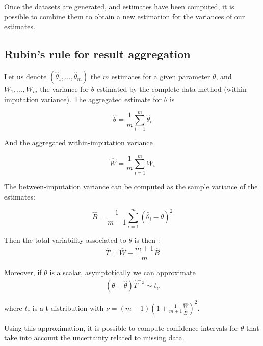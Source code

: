 Once the datasets are generated, and estimates have been computed, it is possible to combine them to obtain a new estimation for the variances of our estimates\cite[Ch.\ 5]{Rubin_missdata}.

		\subsection{Rubin's rule for result aggregation}

Let us denote $(\hat{\theta}_1, \ldots, \hat{\theta}_m)$ the $m$ estimates for a given parameter $\theta$, and $W_1, \ldots, W_m$ the variance for $\theta$ estimated by the complete-data method (within-imputation variance). The aggregated estimate for $\theta$ is

$$\hat{\theta} = \frac{1}{m} \sum\limits_{i=1}^m \hat{\theta}_i $$

And the aggregated within-imputation variance 

$$ \hat{W} = \frac{1}{m} \sum\limits_{i=1}^m W_i  $$

The between-imputation variance can be computed as the sample variance of the estimates:

$$\hat{B} = \frac{1}{m-1} \sum\limits_{i=1}^m (\hat{\theta}_i - \hat{\theta})^2$$

Then the total variability associated to $\theta$ is then \cite[Ch.\ 5]{Rubin_missdata}:
$$\hat{T} = \hat{W} + \frac{m+1}{m} \hat{B}$$

Moreover, if $\theta$ is a scalar, asymptotically we can approximate \cite{rubin1986mi_founding}
$$ (\theta - \hat{\theta})\hat{T}^{-\frac{1}{2}} \sim t_\nu$$

where $t_\nu$ is a t-distribution with $\nu = (m-1)(1+\frac{1}{m+1}\frac{\hat{W}}{\hat{B}})^2$. 

Using this approximation, it is possible to compute confidence intervals for $\theta$ that take into account the uncertainty related to missing data.